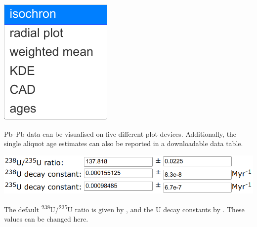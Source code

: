 \begin{refsection}
\noindent\begin{minipage}[t]{.15\linewidth}
\strut\vspace*{-\baselineskip}\newline
\includegraphics[width=\linewidth]{../figures/PbPbPlotdevices.png}\\
\end{minipage}
\begin{minipage}[t]{.85\textwidth}
  Pb--Pb data can be visualised on five different plot devices.
  Additionally, the single aliquot age estimates can also be reported
  in a downloadable data table.
\end{minipage}

\noindent\begin{minipage}[t]{.6\linewidth}
\strut\vspace*{-\baselineskip}\newline
\includegraphics[width=\linewidth]{../figures/PbPbLambda.png}
\end{minipage}
\begin{minipage}[t]{.4\linewidth}
  The default \textsuperscript{238}U/\textsuperscript{235}U ratio is
  given by \citet{hiess2012}, and the U decay constants by
  \citet{jaffey1971}. These values can be changed here.
\end{minipage}


\end{refsection}
